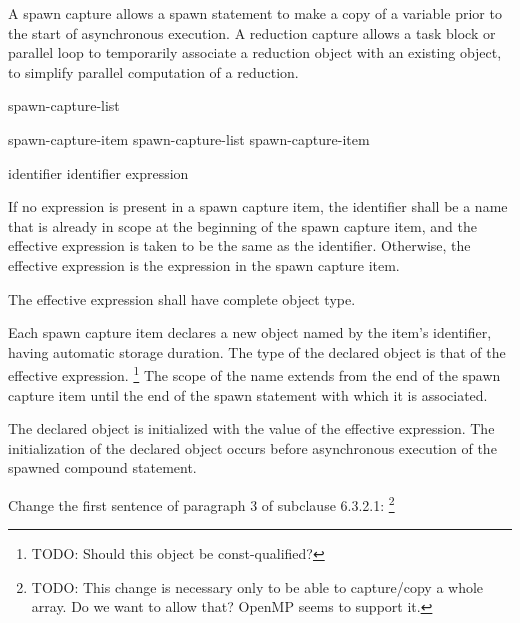 

\pnum
A spawn capture allows a spawn statement
to make a copy of a variable
prior to the start of asynchronous execution.
A reduction capture allows a task block or parallel loop
to temporarily associate a reduction object
with an existing object,
to simplify parallel computation of a reduction.



\begin{bnf}
\br
{} \terminal{(} spawn-capture-list \terminal{)}
\end{bnf}

\begin{bnf}
\br
spawn-capture-item
\br
spawn-capture-list \terminal{,} spawn-capture-item
\end{bnf}

\begin{bnf}
\br
identifier
\br
identifier \terminal{=} expression
\end{bnf}


\pnum
If no expression is present in a spawn capture item,
the identifier shall be a name that is already in scope
at the beginning of the spawn capture item,
and the effective expression is taken to be the same as the identifier.
Otherwise, the effective expression
is the expression in the spawn capture item.

\pnum
The effective expression shall have complete object type.


\pnum
Each spawn capture item declares a new object
named by the item's identifier,
having automatic storage duration.
The type of the declared object is that of the effective expression.
\footnote{TODO:
Should this object be const-qualified?
}
The scope of the name extends from the end of the spawn capture item
until the end of the spawn statement with which it is associated.

\pnum
The declared object is initialized
with the value of the effective expression.
The initialization of the declared object
occurs before asynchronous execution
of the spawned compound statement.

\pnum
Change the first sentence of paragraph 3 of subclause 6.3.2.1:
\footnote{TODO:
This change is necessary only to be able to capture/copy a whole array.
Do we want to allow that?
OpenMP seems to support it.
}

